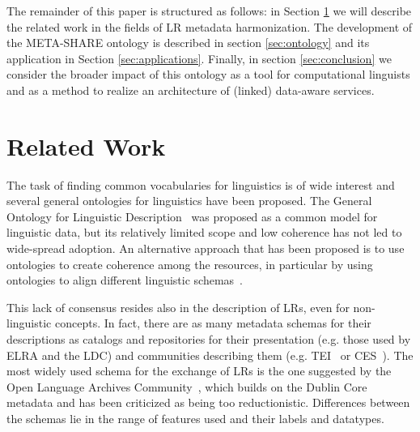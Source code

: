 \documentclass{llncs}
\begin{document}
The remainder of this paper is structured as follows: in Section
\ref{sec:relatedwork} we will describe the related work in the fields of
LR metadata harmonization. The development of the
META-SHARE ontology is described in section \ref{sec:ontology}
and its application in Section \ref{sec:applications}.
Finally, in section \ref{sec:conclusion} we consider the broader
impact of this ontology as a tool for computational linguists and as a method to
realize an architecture of (linked) data-aware services.
\section{Related Work}
\label{sec:relatedwork}
The task of finding common vocabularies for linguistics is of wide interest and several general ontologies for linguistics have been proposed. The General Ontology for Linguistic Description~\cite[GOLD]{farrar2002common} was proposed as a common model for linguistic data, but its relatively limited scope and low coherence has not led to wide-spread adoption. An alternative approach that has been proposed is to use ontologies to create coherence among the resources, in particular by using ontologies to align different linguistic schemas~\cite{chiarcos2012ontologies}.

This lack of consensus resides also in the description of LRs, even for non-linguistic concepts. In fact, there are as many metadata schemas for their descriptions as
catalogs and repositories for their presentation (e.g. those used by ELRA and
the LDC) and communities describing them (e.g. TEI~\cite{ide1995text} or
CES~\cite{ide1998corpus}). The most widely used schema for the exchange of LRs is the one  suggested
by the Open Language Archives Community~\cite[OLAC]{bird2001olac}, which builds on
the Dublin Core metadata and has been criticized as being too reductionistic. %
Differences between the schemas lie in the range of features used and their labels and datatypes.
\end{document}
